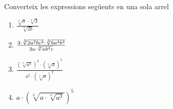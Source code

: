 \begin{exercici}
Converteix les expressions següents en una sola arrel

\begin{enumerate}
\item[a)] $\frac{\sqrt[3]{a}\cdot \sqrt[3]{3}}{\sqrt[3]{2b}}$

\item[b)] $\frac{3\cdot \sqrt[3]{2a^{2}bc^{2}}\cdot \sqrt[3]{6a^{4}b^{2}}}{%
2a\cdot \sqrt[3]{ab^{4}c}}$

\item[c)] $\frac{\left( \sqrt[7]{a^{6}}\right) ^{2}\cdot \left( \sqrt[7]{a}%
\right) ^{5}}{a^{2}\cdot \left( \sqrt[7]{a}\right) ^{2}}$

\item[d)] $a\cdot \left( \sqrt[3]{a\cdot \sqrt[4]{a^{3}}}\right) ^{5}$
\end{enumerate}

\end{exercici}

